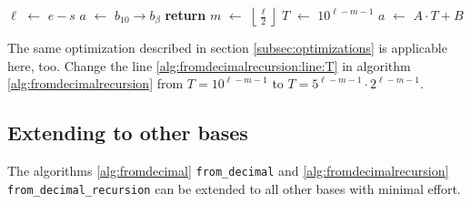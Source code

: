 \documentclass[a4paper,10pt]{article}
\newcommand*\Let[2]{\State #1 $\gets$ #2}
\newcommand{\RETURN}{\State \textbf{return} }
\providecommand{\floor}[1]{\left\lfloor#1\right\rfloor}
\theoremstyle{plain} %
\theoremstyle{definition}
\theoremstyle{remark}
\newcommand*{\smalltt}[1]{\small\texttt{#1}}
\begin{document}
\begin{center}
\begin{minipage}{.9\linewidth}
  \begin{algorithmic}[1]
    \Let{$\ell$}{$e - s$ }
      \Let{$a$}{$b_{10} \to b_\beta$}
      \RETURN
    \Else
      \Let{$m$}{$\floor{\frac{\ell}{2}}$}
      \State {}
      \State {}
      \Let{$T$}{$10^{\ell - m - 1}$}\label{alg:fromdecimalrecursion:line:T}
      \Let{$a$}{$A \cdot T + B$}
    \EndIf
    \EndFunction
  \end{algorithmic}
\end{minipage}
\end{center}

The same optimization described in section \ref{subsec:optimizations} is applicable here, too. Change the line \ref{alg:fromdecimalrecursion:line:T} in algorithm \ref{alg:fromdecimalrecursion} from $T = 10^{\ell - m - 1}$ to $T = 5^{\ell - m - 1} \cdot 2^{\ell - m - 1}$.

\subsection{Extending to other bases}

The algorithms \ref{alg:fromdecimal} \smalltt{from\_decimal} and \ref{alg:fromdecimalrecursion} \smalltt{from\_decimal\_recursion} can be extended to all other bases with minimal effort.
\end{document}
